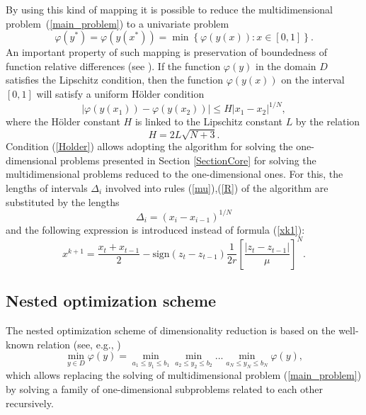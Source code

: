 \documentclass[runningheads]{llncs}
\begin{document}
By using this kind of mapping it is possible to reduce the multidimensional 
problem~(\ref{main_problem}) to a univariate problem
\begin{equation}
\varphi(y^\ast)=\varphi(y(x^\ast))=\min{\left\{\varphi(y(x)): x\in[0,1]
\right\}}.
\end{equation}
An important property of such mapping is preservation of boundedness of 
function relative differences (see \cite{Strongin2000,Sergeyev2013}). If the 
function $\varphi(y)$ in the domain $D$ satisfies the Lipschitz condition, 
then the function $\varphi(y(x))$ on the interval $[0,1]$ will satisfy a 
uniform H{\"o}lder condition
\begin{equation}\label{Holder}
\left|\varphi(y(x_1))-\varphi(y(x_2))\right|\leq H\left|x_1-x_2\right|^{1/N},
\end{equation}
where the H{\"o}lder constant $H$ is linked to the Lipschitz constant $L$ by 
the relation
\begin{equation}
H=2L\sqrt{N+3}.
\end{equation}
Condition (\ref{Holder}) allows adopting the algorithm for solving the 
one-dimensional problems presented in Section \ref{SectionCore} for solving the 
multidimensional problems reduced to the one-dimensional ones. For this, the 
lengths of intervals $\Delta_i$  involved into rules (\ref{mu}),(\ref{R}) of the
algorithm are substituted by the lengths 
\begin{equation}
\Delta_i=\left(x_i-x_{i-1}\right)^{1/N}
\end{equation}
and the following expression is introduced instead of formula (\ref{xk1}):
\begin{equation}
x^{k+1} = \frac{x_t+x_{t-1}}{2} - \mathrm{sign}(z_t-z_{t-1})\frac{1}{2r}
\left[\frac{\left|z_t-z_{t-1}\right|}{\mu}\right]^N.
\end{equation}

\subsection{Nested optimization scheme}

The nested optimization scheme of dimensionality reduction is based on the 
well-known relation (see, e.g., \cite{Carr1964})
\begin{equation}\label{nested}
\min_{y \in D}\varphi(y) = \min_{a_1\leq y_1 \leq b_1}\min_{a_2\leq y_2 \leq 
b_2}...\min_{a_N\leq y_N \leq b_N}\varphi(y),
\end{equation}
which allows replacing the solving of multidimensional problem 
(\ref{main_problem}) by solving a family of one-dimensional subproblems 
related to each other recursively.
\end{document}
